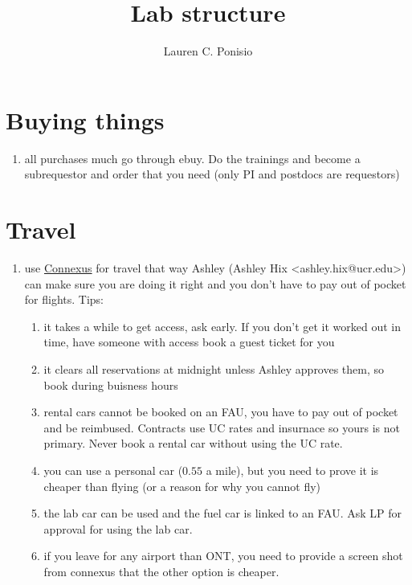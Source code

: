 \documentclass[12pt]{article}
\title{Lab structure}
\author{Lauren C. Ponisio}
\begin{document}
\maketitle

\section{Buying things}
\begin{enumerate}
\item all purchases much go through ebuy. Do the trainings and become
  a subrequestor and order that you need (only PI and postdocs are
  requestors)
\end{enumerate}

\section{Travel}
\begin{enumerate}
\item use \href{https://www.ucgo.org/register-travel-connexus}
  {Connexus} for travel that way Ashley (Ashley Hix
  <ashley.hix@ucr.edu>) can make sure you are doing it right and you
  don't have to pay out of pocket for flights. Tips:
  \begin{enumerate}
  \item it takes a while to get access, ask early. If you don't get
    it worked out in time, have someone with access book a guest
    ticket for you
  \item it clears all reservations at midnight unless Ashley approves
    them, so book during buisness hours
  \item rental cars cannot be booked on an FAU, you have to pay out
    of pocket and be reimbused. Contracts use UC rates and insurnace
    so yours is not primary. Never book a rental car without using
    the UC rate.
  \item you can use a personal car ($0.55$ a mile), but you need to
    prove it is cheaper than flying (or a reason for why you cannot
    fly)
  \item the lab car can be used and the fuel car is linked to an
    FAU. Ask LP for approval for using the lab car.
  \item if you leave for any airport than ONT, you need to provide a
    screen shot from connexus that the other option is cheaper.
  \end{enumerate}      
\end{enumerate}
\end{document}
